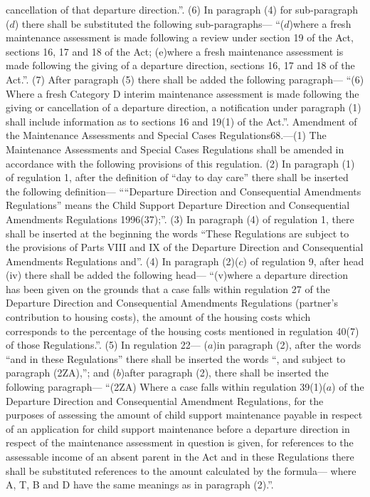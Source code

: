 \documentclass[a4paper]{article}
\begin{document}
cancellation of that departure direction.”.
(6) In paragraph (4) for sub-paragraph ($d$) there shall be substituted the
following sub-paragraphs—
“($d$)where a fresh maintenance assessment is made following a review under
section 19 of the Act, sections 16, 17 and 18 of the Act;
(e)where a fresh maintenance assessment is made following the giving of a
departure direction, sections 16, 17 and 18 of the Act.”.
(7) After paragraph (5) there shall be added the following paragraph—
“(6) Where a fresh Category D interim maintenance assessment is made following
the giving or cancellation of a departure direction, a notification under
paragraph (1) shall include information as to sections 16 and 19(1) of the
Act.”.
Amendment of the Maintenance Assessments and Special Cases Regulations68.—(1)
The Maintenance Assessments and Special Cases Regulations shall be amended in
accordance with the following provisions of this regulation.
(2) In paragraph (1) of regulation 1, after the definition of “day to day care”
there shall be inserted the following definition—
““Departure Direction and Consequential Amendments Regulations” means the Child
Support Departure Direction and Consequential Amendments Regulations 1996(37);”.
(3) In paragraph (4) of regulation 1, there shall be inserted at the beginning
the words “These Regulations are subject to the provisions of Parts VIII and IX
of the Departure Direction and Consequential Amendments Regulations and”.
(4) In paragraph (2)($c$) of regulation 9, after head (iv) there shall be added
the following head—
“(v)where a departure direction has been given on the grounds that a case falls
within regulation 27 of the Departure Direction and Consequential Amendments
Regulations (partner’s contribution to housing costs), the amount of the housing
costs which corresponds to the percentage of the housing costs mentioned in
regulation 40(7) of those Regulations.”.
(5) In regulation 22—
($a$)in paragraph (2), after the words “and in these Regulations” there shall be
inserted the words “, and subject to paragraph (2ZA),”; and
($b$)after paragraph (2), there shall be inserted the following paragraph—
“(2ZA) Where a case falls within regulation 39(1)($a$) of the Departure Direction
and Consequential Amendment Regulations, for the purposes of assessing the
amount of child support maintenance payable in respect of an application for
child support maintenance before a departure direction in respect of the
maintenance assessment in question is given, for references to the assessable
income of an absent parent in the Act and in these Regulations there shall be
substituted references to the amount calculated by the formula—
where A, T, B and D have the same meanings as in paragraph (2).”.
\end{document}
